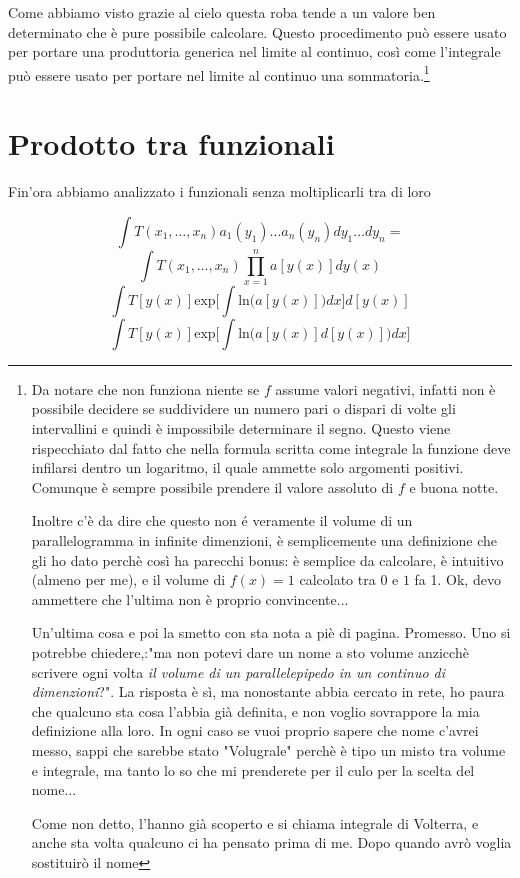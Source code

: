 \documentclass[11pt,a4paper]{report}
\theoremstyle{definition}
\theoremstyle{plain}
\theoremstyle{plain}
\begin{document}
			Come abbiamo visto grazie al cielo questa roba tende a un valore ben determinato che è pure possibile calcolare. Questo procedimento può essere usato per portare una produttoria generica nel limite al continuo, così come l'integrale può essere usato per portare nel limite al continuo una sommatoria.\footnote{
				Da notare che non funziona niente se $f$ assume valori negativi, infatti non è possibile decidere se suddividere un numero pari o dispari di volte gli intervallini e quindi è impossibile determinare il segno.
				\newline Questo viene rispecchiato dal fatto che nella formula scritta come integrale la funzione deve infilarsi dentro un logaritmo, il quale ammette solo argomenti positivi.
				\newline Comunque è sempre possibile prendere il valore assoluto di $f$ e buona notte.\newline

				Inoltre c'è da dire che questo non é veramente il volume di un parallelogramma in infinite dimenzioni, è semplicemente una definizione che gli ho dato perchè così ha parecchi bonus: è semplice da calcolare, è intuitivo (almeno per me), e il volume di $f(x)=1$ calcolato tra $0$ e $1$ fa 1. Ok, devo ammettere che l'ultima non è proprio convincente...\newline

				Un'ultima cosa e poi la smetto con sta nota a piè di pagina. Promesso.\newline
				Uno si potrebbe chiedere,:"ma non potevi dare un nome a sto volume anzicchè scrivere ogni volta \emph{il volume di un parallelepipedo in un continuo di dimenzioni}?". La risposta è sì, ma nonostante abbia cercato in rete, ho paura che qualcuno sta cosa l'abbia già definita, e non voglio sovrappore la mia definizione alla loro. In ogni caso se vuoi proprio sapere che nome c'avrei messo, sappi che sarebbe stato "Volugrale" perchè è tipo un misto tra volume e integrale, ma tanto lo so che mi prenderete per il culo per la scelta del nome...\newline

				Come non detto, l'hanno già scoperto e si chiama integrale di Volterra, e anche sta volta qualcuno ci ha pensato prima di me. Dopo quando avrò voglia sostituirò il nome}





		\section{Prodotto tra funzionali}
			Fin'ora abbiamo analizzato i funzionali senza moltiplicarli tra di loro

			\begin{equation}
				\int T(x_1,\dots,x_n)a_1(y_1)\dots a_n(y_n)dy_1\dots dy_n=
			\end{equation}
			\[
				\int T(x_1,\dots,x_n)\prod_{x=1}^n a[y(x)]dy(x)
			\]
			\[
				\int T[y(x)]\textrm{exp}\bigg[\int \textrm{ln}\big(a[y(x)]\big)dx\bigg]d[y(x)]
			\]
			\[
				\int T[y(x)]\textrm{exp}\bigg[\int \textrm{ln}\big(a[y(x)]d[y(x)]\big)dx\bigg]
			\]
\end{document}

